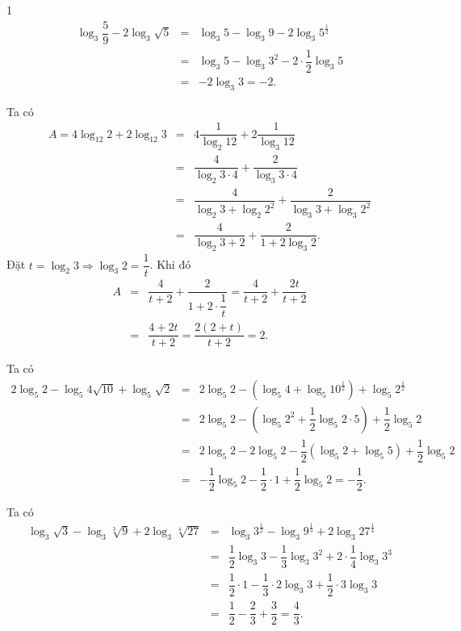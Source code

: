 \begin{vd}
{\begin{enumEX}[\hspace*{.5cm}a)]{1}
			\begin{eqnarray*}
				\log _{3} \dfrac{5}{9}-2 \log _{3} \sqrt{5}&=&\log _{3} 5-\log _{3} 9-2 \log _{3} 5^{\tfrac{1}{2}}\\
				&=&\log _{3} 5-\log _{3} 3^2-2\cdot \dfrac{1}{2} \log _{3} 5\\
				&=&-2\log _{3} 3=-2
				.
			\end{eqnarray*}
			\item Ta có \allowdisplaybreaks
			\begin{eqnarray*}
				A=4 \log _{12} 2+2 \log _{12} 3&=&4 \dfrac{1}{\log _2 12}+2 \dfrac{1}{\log _3 12}\\
				&=& \dfrac{4}{\log _2 3\cdot 4}+ \dfrac{2}{\log _3 3\cdot 4}\\
				&=& \dfrac{4}{\log _2 3+\log _2 2^2}+ \dfrac{2}{\log _3 3+\log _3 2^2}\\
				&=& \dfrac{4}{\log _2 3+2}+ \dfrac{2}{1+2\log _3 2}.
			\end{eqnarray*}
			Đặt $t=\log _2 3\Rightarrow \log _3 2=\dfrac{1}{t}$. Khi đó
			\begin{eqnarray*}
				A&=& \dfrac{4}{t+2}+ \dfrac{2}{1+2\cdot  \dfrac{1}{t}}=\dfrac{4}{t+2}+ \dfrac{2t}{t+2}\\&=&\dfrac{4+2t}{t+2}=\dfrac{2(2+t)}{t+2}=2.
			\end{eqnarray*}
			
			\item Ta có \allowdisplaybreaks
			\begin{eqnarray*}
				2 \log _{5} 2-\log _{5} 4 \sqrt{10}+\log _{5} \sqrt{2}&=&2 \log _{5} 2-\left(\log _{5} 4 +\log _{5} 10^{\tfrac{1}{2}}\right)+\log _{5} 2^{\tfrac{1}{2}}\\
				&=&2 \log _{5} 2-\left(\log _{5} 2^2 +\dfrac{1}{2}\log _{5} 2\cdot 5\right)+\dfrac{1}{2}\log _{5} 2\\
				&=&2 \log _{5} 2-2\log _{5} 2 -\dfrac{1}{2}\left(\log _{5} 2+\log _{5} 5\right)+\dfrac{1}{2}\log _{5} 2\\
				&=&-\dfrac{1}{2}\log _{5} 2-\dfrac{1}{2}\cdot 1+\dfrac{1}{2}\log _{5} 2=-\dfrac{1}{2}.
			\end{eqnarray*}
			\item Ta có \allowdisplaybreaks
			\begin{eqnarray*}
				\log _{3} \sqrt{3}-\log _{3} \sqrt[3]{9}+2 \log _{3} \sqrt[4]{27}&=&\log _{3} 3^{\tfrac{1}{2}}-\log _{3} 9^{\tfrac{1}{3}}+2 \log _{3} 27^{\tfrac{1}{4}}\\&=&\dfrac{1}{2}\log _{3} 3-\dfrac{1}{3}\log _{3} 3^2+2\cdot \dfrac{1}{4} \log _{3} 3^3\\
				&=&\dfrac{1}{2}\cdot 1-\dfrac{1}{3}\cdot  2\log _{3} 3+ \dfrac{1}{2}\cdot 3 \log _{3} 3\\
				&=&\dfrac{1}{2}-\dfrac{2}{3}+ \dfrac{3}{2}=\dfrac{4}{3}
				.
			\end{eqnarray*}
\end{enumEX} }
\end{vd} 

